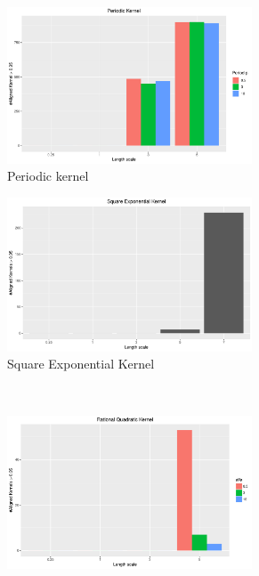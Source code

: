 \documentclass[11pt, a4paper]{article} %
\begin{document}
\begin{landscape}
\begin{figure}
        \centering
        \begin{subfigure}[b]{0.475\hsize}\centering
            \centering
            \includegraphics[width=0.8\textwidth]{Ex1_KPR.pdf}
            \caption[Periodic Kernel]%
            {{\small Periodic kernel}} 
        \end{subfigure}
        \quad
        \begin{subfigure}[b]{0.475\hsize}\centering
            \centering 
            \includegraphics[width=0.8\textwidth]{Ex1_KSE.pdf}
            \caption[]%
            {{\small Square Exponential Kernel}}    
        \end{subfigure}
        \\
        \begin{subfigure}[b]{0.475\hsize}\centering   
            \centering 
            \includegraphics[width=0.8\textwidth]{Ex1_KRQ.pdf}

\end{subfigure}
\end{figure}
\end{landscape}
\end{document}
